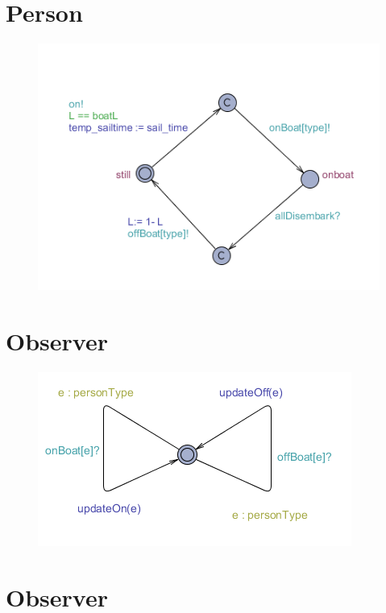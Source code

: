 \section{Person}
\begin{figure}%
\includegraphics[width=\columnwidth]{pictures/person.png}%
\caption{}%
\label{}%
\end{figure}



















\section{Observer}
\begin{figure}%
\includegraphics[width=\columnwidth]{pictures/observer.png}%
\caption{}%
\label{}%
\end{figure}




























\section{Observer}